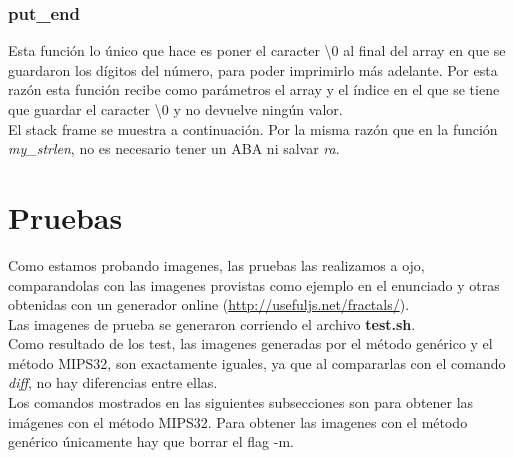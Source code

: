 \documentclass[a4paper,10pt]{article}
\begin{document}
\begin{center}
\begin{drawstack}
	\startframe
	 
	 
	 
	 
	\startframe
	 
	 
	\startframe
	 
	 
	 
	 
\end{drawstack}
\end{center}

\subsubsection{put\_end}
Esta función lo único que hace es poner el caracter \textbackslash0 al final del array en que se guardaron los dígitos del número, para poder imprimirlo más adelante. Por esta razón esta función recibe como parámetros el array y el índice en el que se tiene que guardar el caracter \textbackslash0 y no devuelve ningún valor. \\
El stack frame se muestra a continuación. Por la misma razón que en la función \textit{my\_strlen}, no es necesario tener un ABA ni salvar \textit{ra}.

\begin{center}
\begin{drawstack}
	\startframe
	 
	 
\end{drawstack}
\end{center}

\section{Pruebas}
Como estamos probando imagenes, las pruebas las realizamos a ojo, comparandolas con las imagenes provistas como ejemplo en el enunciado y otras obtenidas con un generador online (\url{http://usefuljs.net/fractals/}). \\
Las imagenes de prueba se generaron corriendo el archivo \textbf{test.sh}. \\
Como resultado de los test, las imagenes generadas por el método genérico y el método MIPS32, son exactamente iguales, ya que al compararlas con el comando \textit{diff}, no hay diferencias entre ellas. \\
Los comandos mostrados en las siguientes subsecciones son para obtener las imágenes con el método MIPS32. Para obtener las imagenes con el método genérico únicamente hay que borrar el flag -m.
\end{document}
